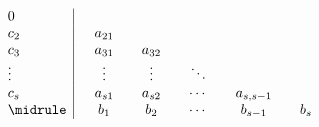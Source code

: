 \begin{equation*}
  \begin{array}{l | c c c c c}
    0      \quad &               &              &              &         &   \\
    c_2    \quad & \quad a_{21}  &              &              &         &   \\
    c_3    \quad & \quad a_{31}  & \quad a_{32} &              &         &   \\
    \vdots \quad & \quad \vdots  & \quad \vdots & \quad \ddots &         &   \\
    c_s    \quad & \quad a_{s1}  & \quad a_{s2} & \quad \cdots & \quad a_{s,s-1} & \\ \midrule
    & \quad b_{1}   & \quad b_{2}  & \quad \cdots & \quad b_{s-1}  & \quad b_{s}
  \end{array}
\end{equation*}
